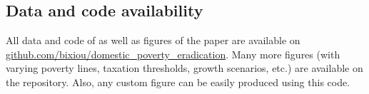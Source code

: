 
  \begin{small} %





\section*{\normalsize Data and code availability}

All data and code of as well as figures of the paper are available on \href{https://github.com/bixiou/domestic_poverty_eradication}{github.com/bixiou/domestic\_poverty\_eradication}. Many more figures (with varying poverty lines, taxation thresholds, growth scenarios, etc.) are available on the repository. %
Also, any custom figure can be easily produced using this code.

\end{small}  %

